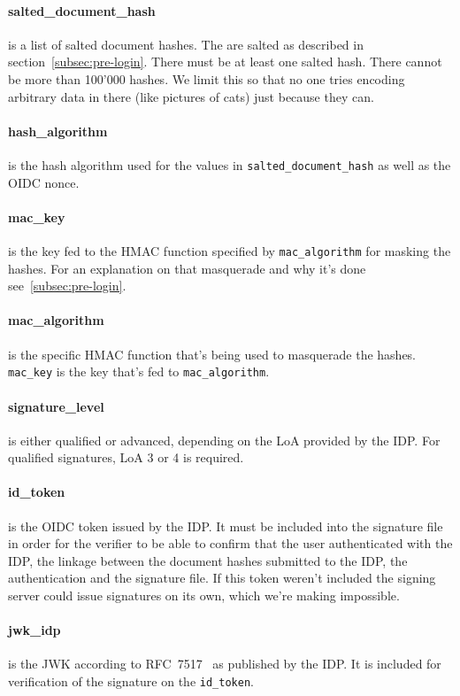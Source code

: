 \paragraph{salted\_document\_hash} is a list of salted document hashes.
The are salted as described in section~\ref{subsec:pre-login}.
There must be at least one salted hash.
There cannot be more than 100'000 hashes.
We limit this so that no one tries encoding arbitrary data in there (like pictures of cats) just because they can.

\paragraph{hash\_algorithm} is the hash algorithm used for the values in \texttt{salted\_document\_hash} as well as the \gls{OIDC} nonce.
\paragraph{mac\_key} is the key fed to the \gls{HMAC} function specified by \texttt{mac\_algorithm} for masking the hashes.
For an explanation on that masquerade and why it's done see~\ref{subsec:pre-login}.
\paragraph{mac\_algorithm} is the specific \gls{HMAC} function that's being used to masquerade the hashes.
\texttt{mac\_key} is the key that's fed to \texttt{mac\_algorithm}.
\paragraph{signature\_level} is either qualified or advanced, depending on the \gls{LoA} provided by the \gls{IDP}.
For qualified signatures, \gls{LoA} 3 or 4 is required.
\paragraph{id\_token} is the \gls{OIDC} token issued by the \gls{IDP}.
It must be included into the signature file in order for the verifier to be able to confirm that the user authenticated with the \gls{IDP},
the linkage between the document hashes submitted to the \gls{IDP}, the authentication and the signature file.
If this token weren't included the signing server could issue signatures on its own, which we're making impossible.
\paragraph{jwk\_idp} is the \gls{JWK} according to RFC~7517~\cite{rfc7517} as published by the \gls{IDP}.
It is included for verification of the signature on the \texttt{id\_token}.
